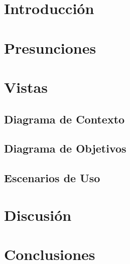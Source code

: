 \documentclass[10pt, a4paper]{article}
\begin{document}
	

\newcommand{\cod}[1]{{\tt #1}}
\newcommand{\negro}[1]{{\bf #1}}
\newcommand{\ital}[1]{{\em #1}}
\newcommand{\may}[1]{{\sc #1}}
\newcommand{\tab}{\hspace*{2em}}

\newenvironment{myindentpar}[1]
{\begin{list}{1}
         {\setlength{\leftmargin}{#1}}
         \item[]
}
{\end{list} }

\section{Introducci\'on}

\section{Presunciones}

\section{Vistas}
\subsection{Diagrama de Contexto}

\subsection{Diagrama de Objetivos}

\subsection{Escenarios de Uso}

\section{Discusi\'on}

\section{Conclusiones}

\end{document}
